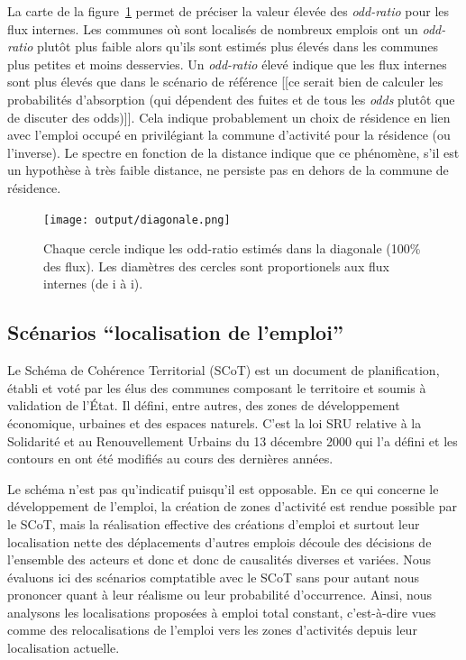 \documentclass[
  10pt,
  a4paper,
  numbers=noendperiod,
  DIV=12]{scrartcl}
\begin{document}
La carte de la figure~\ref{fig-carteodd} permet de préciser la valeur
élevée des \emph{odd-ratio} pour les flux internes. Les communes où sont
localisés de nombreux emplois ont un \emph{odd-ratio} plutôt plus faible
alors qu'ils sont estimés plus élevés dans les communes plus petites et
moins desservies. Un \emph{odd-ratio} élevé indique que les flux
internes sont plus élevés que dans le scénario de référence {[}{[}ce
serait bien de calculer les probabilités d'absorption (qui dépendent des
fuites et de tous les \emph{odds} plutôt que de discuter des
odds){]}{]}. Cela indique probablement un choix de résidence en lien
avec l'emploi occupé en privilégiant la commune d'activité pour la
résidence (ou l'inverse). Le spectre en fonction de la distance indique
que ce phénomène, s'il est un hypothèse à très faible distance, ne
persiste pas en dehors de la commune de résidence.\\

\begin{figure}[htb]

{\centering \texttt{[image: output/diagonale.png]}

}

\caption[Odd-ratio dans la diagonale]{\label{fig-carteodd}Chaque cercle
indique les odd-ratio estimés dans la diagonale (100\% des flux). Les
diamètres des cercles sont proportionels aux flux internes (de i à i).}

\end{figure}

\hypertarget{scuxe9narios-localisation-de-lemploi}{%
\subsection{Scénarios ``localisation de
l'emploi''}\label{scuxe9narios-localisation-de-lemploi}}

Le Schéma de Cohérence Territorial (SCoT) est un document de
planification, établi et voté par les élus des communes composant le
territoire et soumis à validation de l'État. Il défini, entre autres,
des zones de développement économique, urbaines et des espaces naturels.
C'est la loi SRU relative à la Solidarité et au Renouvellement Urbains
du 13 décembre 2000 qui l'a défini et les contours en ont été modifiés
au cours des dernières années.

Le schéma n'est pas qu'indicatif puisqu'il est opposable. En ce qui
concerne le développement de l'emploi, la création de zones d'activité
est rendue possible par le SCoT, mais la réalisation effective des
créations d'emploi et surtout leur localisation nette des déplacements
d'autres emplois découle des décisions de l'ensemble des acteurs et donc
et donc de causalités diverses et variées. Nous évaluons ici des
scénarios comptatible avec le SCoT sans pour autant nous prononcer quant
à leur réalisme ou leur probabilité d'occurrence. Ainsi, nous analysons
les localisations proposées à emploi total constant, c'est-à-dire vues
comme des relocalisations de l'emploi vers les zones d'activités depuis
leur localisation actuelle.
\end{document}
